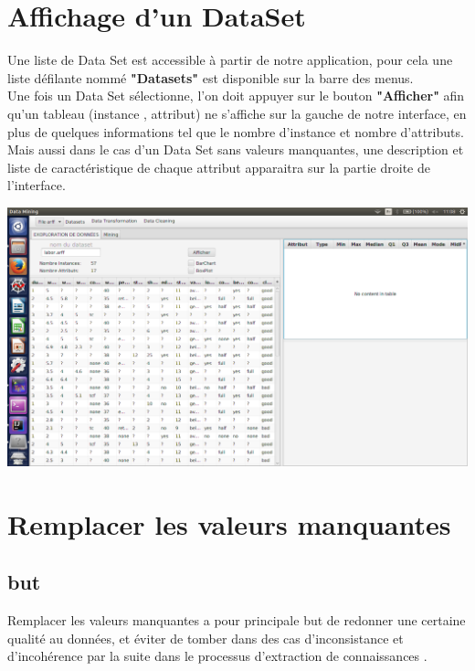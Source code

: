 \documentclass[12pt,a4paper,oneside]{book}
\begin{document}
\section{Affichage d'un DataSet}
Une liste de Data Set est accessible à partir de notre application, pour cela une liste défilante nommé \textbf{"Datasets"} est disponible sur la barre des menus.\\

Une fois un Data Set sélectionne, l'on doit appuyer sur le bouton \textbf{"Afficher"} afin qu'un tableau (instance , attribut) ne s'affiche sur la gauche de notre interface, en plus de quelques informations tel que le nombre d'instance et nombre d'attributs.\\

Mais aussi dans le cas d'un Data Set sans valeurs manquantes, une description et liste de caractéristique de chaque attribut apparaitra sur la partie droite de l'interface.

\begin{center}
	\includegraphics[width=1\textwidth]{screens/avantMissing.png}%
	\label{labelname}%
\end{center}


\section{Remplacer les valeurs manquantes}
\subsection{but}
Remplacer les valeurs manquantes a pour principale but de redonner une certaine qualité au données, et éviter de tomber dans des cas d'inconsistance et d'incohérence par la suite dans le processus d'extraction de connaissances .
\end{document}
